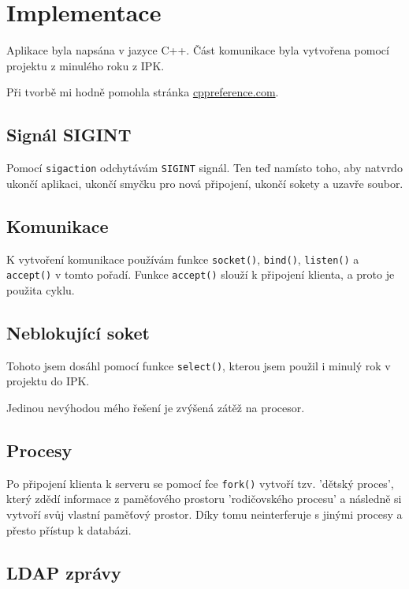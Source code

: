 \documentclass[a4paper, 11pt]{article}
\begin{document}
\section{Implementace}

Aplikace byla napsána v jazyce C++. Část komunikace byla vytvořena pomocí projektu z minulého roku z IPK.

Při tvorbě mi hodně pomohla stránka \href{http://en.cppreference.com/w/}{cppreference.com}.


\subsection{Signál SIGINT}

Pomocí \texttt{sigaction} odchytávám \texttt{SIGINT} signál. Ten teď namísto toho, aby natvrdo ukončí aplikaci, ukončí smyčku pro nová připojení, ukončí sokety a uzavře soubor.

\subsection{Komunikace}

K vytvoření komunikace používám funkce \texttt{socket()}, \texttt{bind()}, \texttt{listen()} a \texttt{accept()} v tomto pořadí. Funkce \texttt{accept()} slouží k připojení klienta, a proto je použita cyklu.

\subsection{Neblokující soket}

Tohoto jsem dosáhl pomocí funkce \texttt{select()}, kterou jsem použil i minulý rok v projektu do IPK.

Jedinou nevýhodou mého řešení je zvýšená zátěž na procesor.

\subsection{Procesy}

Po připojení klienta k serveru se pomocí fce \texttt{fork()} vytvoří tzv. 'dětský proces', který zdědí informace z paměťového prostoru 'rodičovského procesu' a následně si vytvoří svůj vlastní paměťový prostor. Díky tomu neinterferuje s jinými procesy a přesto přístup k databázi.

\subsection{LDAP zprávy}
\end{document}
